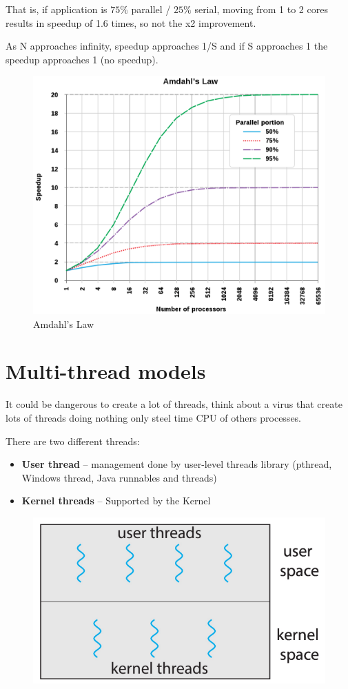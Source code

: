That is, if application is $75\%$ parallel / $25\% $ serial, moving from 1 to 2
cores results in speedup of 1.6 times, so not the x2 improvement.

As N approaches infinity, speedup approaches 1/S and if S approaches 1 the speedup approaches 1 (no speedup).

\begin{figure}[htbp]
    \centering
    \includegraphics[width=0.65\linewidth]{img/amdahl'slaw.png}
    \caption{Amdahl’s Law}    
\end{figure}

\newpage
\section{Multi-thread models}

It could be dangerous to create a lot of threads, think about a virus that create lots of threads doing nothing only steel time CPU of others processes.

There are two different threads: 

\begin{itemize}
    \item[] \textbf{User thread} -- management done by user-level threads library (pthread, Windows thread, Java runnables and threads)
    \item[] \textbf{Kernel threads} -- Supported by the Kernel
\end{itemize}

\begin{figure}[htbp]
    \centering
    \includegraphics[width=0.5\linewidth]{img/user_space_thread.png}    
\end{figure}

